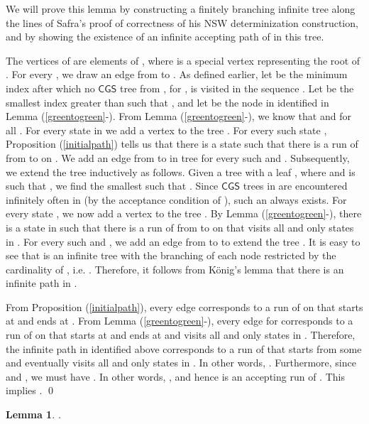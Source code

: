 \documentclass[3p]{elsarticle}
\newtheorem{lemma}[theorem]{Lemma}
\newcommand{\CGS}{\ensuremath{\textsf{CGS }}}
\begin{document}
 We will prove this lemma by constructing a
finitely branching infinite tree  along the lines of Safra's proof
of correctness of his NSW determinization construction, and by showing
the existence of an infinite accepting path of  in this tree.

The vertices of  are elements of , where  is a special vertex representing the
root of .  For every , we draw an edge from
 to .  As defined earlier, let  be the
minimum index after which no \CGS tree from , for ,
is visited in the sequence .  Let  be the
smallest index greater than  such that , and let
 be the node in  identified in Lemma
(\ref{greentogreen}-).  From Lemma (\ref{greentogreen}-), we
know that  and 
for all .  For every state  in  we
add a vertex  to the tree .  For every such state ,
Proposition (\ref{initialpath}) tells us that there is a state  such that there is a run of  from  to  on
.  We add an edge from  to  in
tree  for every such  and .
Subsequently, we extend the tree  inductively as follows. Given a
tree with a leaf , where  and
 is such that , we find the smallest
 such that .  Since \CGS trees in
 are encountered infinitely often in  (by
the acceptance condition of ), such an  always exists.
For every state , we now add a vertex
 to the tree .  By Lemma (\ref{greentogreen}-),
there is a state  in  such that there is a run of
 from  to  on  that visits all and
only states in .  For every such  and , we add an edge
from  to  to extend the tree .  It is
easy to see that  is an infinite tree with the branching of each
node  restricted by the cardinality of
, i.e. .  Therefore, it follows from
K\"onig's lemma that there is an infinite path in . 

From Proposition (\ref{initialpath}), every edge  corresponds to a run of  on  that
starts at  and ends at . From Lemma (\ref{greentogreen}-),
every edge  for  corresponds to a
run of  on  that starts at  and ends
at  and visits all and only states in .
Therefore, the infinite path in  identified above corresponds to a
run  of  that starts from some  and eventually
visits all and only states in .  In other words,
.  Furthermore, since 
and , we must have .  In other words, , and hence 
is an accepting run of . This implies .  \qed



\begin{lemma}\label{lemma2}
.
\end{lemma}
\end{document}

